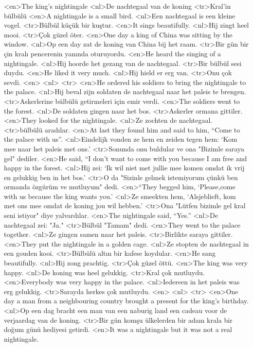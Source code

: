 <en>The king’s nightingale
<nl>De nachtegaal van de koning
<tr>Kral'in bülbülü
<en>A nightingale is a small bird.
<nl>Een nachtegaal is een kleine vogel.
<tr>Bülbül küçük bir kuştur.
<en>It sings beautifully.
<nl>Hij zingt heel mooi.
<tr>Çok güzel öter.
<en>One day a king of China was sitting by the window.
<nl>Op een day zat de koning van China bij het raam.
<tr>Bir gün bir çin kralı pencerenin yanında oturuyordu.
<en>He heard the singing of a nightingale.
<nl>Hij hoorde het gezang van de nachtegaal.
<tr>Bir bülbül sesi duydu.
<en>He liked it very much.
<nl>Hij hield er erg van.
<tr>Onu çok sevdi.
<en>
<nl>
<tr>
<en>He ordered his soldiers to bring the nightingale to the palace.
<nl>Hij beval zijn soldaten de nachtegaal naar het paleis te brengen.
<tr>Askerlerine bülbülü getirmeleri için emir verdi.
<en>The soldiers went to the forest.
<nl>De soldaten gingen naar het bos.
<tr>Askerler ormana gittiler.
<en>They looked for the nightingale.
<nl>Ze zochten de nachtegaal.
<tr>bülbülü aradılar.
<en>At last they found him and said to him, “Come to the palace with us”.
<nl>Eindelijk vonden ze hem en zeiden tegen hem: `Kom mee naar het paleis met ons.'
<tr>Sonunda onu buldular ve ona "Bizimle saraya gel" dediler.
<en>He said, “I don’t want to come with you  because  I am free and happy in the forest.
<nl>Hij zei: `Ik wil niet met jullie mee komen omdat ik vrij en gelukkig ben in het bos.'
<tr>O da "Sizinle gelmek istemiyorum çünkü ben ormanda özgürüm ve mutluyum" dedi.
<en>“They begged him, `Please,come with us because the king wants you.'
<nl>Ze smeekten hem, `Alsjeblieft, kom met ons mee omdat de koning jou wil hebben.'
<tr>Ona "Lütfen bizimle gel kral seni istiyor" diye yalvardılar.
<en>The nightingale said, “Yes.”
<nl>De nachtegaal zei: "Ja."
<tr>Bülbül "Tamam" dedi.
<en>They went to the palace together.
<nl>Ze gingen samen naar het paleis.
<tr>Birlikte saraya gittiler.
<en>They put the nightingale in a golden cage.
<nl>Ze stopten de nachtegaal in een gouden kooi.
<tr>Bülbülü altın bir kafese koydular.
<en>He sang beautifully.
<nl>Hij zong prachtig.
<tr>Çok güzel öttü.
<en>The king was very happy.
<nl>De koning was heel gelukkig.
<tr>Kral çok mutluydu.
<en>Everybody was very happy in the palace.
<nl>Iedereen in het paleis was erg gelukkig.
<tr>Sarayda herkes çok mutluydu.
<en>
<nl>
<tr>
<en>One day a man from a neighbouring country brought a present for the king’s birthday.
<nl>Op een dag bracht een man van een naburig land een cadeau voor de verjaardag van de koning.
<tr>Bir gün komşu ülkelerden bir adam krala bir doğum günü hediyesi getirdi.
<en>It was a nightingale but it was not a real nightingale.
